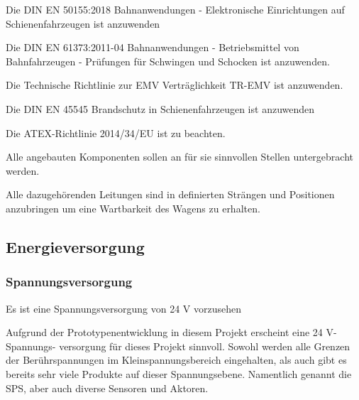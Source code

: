 \begin{feat}
Die \acrshort{DIN} \acrshort{EN} 50155:2018 Bahnanwendungen - Elektronische Einrichtungen auf Schienenfahrzeugen ist anzuwenden
\end{feat}
\begin{feat}
Die \acrshort{DIN} \acrshort{EN} 61373:2011-04 Bahnanwendungen - Betriebsmittel von Bahnfahrzeugen - Prüfungen für Schwingen und Schocken ist anzuwenden.
\end{feat}
\begin{feat}
Die Technische Richtlinie zur EMV Verträglichkeit TR-EMV ist anzuwenden.
\end{feat}
\begin{feat}
Die \acrshort{DIN} \acrshort{EN} 45545 Brandschutz in Schienenfahrzeugen ist anzuwenden
\end{feat}
\begin{feat}
Die ATEX-Richtlinie 2014/34/EU ist zu beachten.
\end{feat}
\begin{feat}
Alle angebauten Komponenten sollen an für sie sinnvollen Stellen untergebracht werden.
\end{feat}
\begin{rem}[zu Anf. 09]
Alle dazugehörenden Leitungen sind in definierten Strängen und Positionen anzubringen um eine Wartbarkeit des Wagens zu erhalten.
\end{rem}

\subsection{Energieversorgung}\label{sec:EV}
\subsubsection{Spannungsversorgung}
\begin{feat}
Es ist eine Spannungsversorgung von 24 V vorzusehen
\end{feat}
\begin{rem}[zu Anf. 10]
Aufgrund der Prototypenentwicklung in diesem Projekt erscheint eine 24 V-Spannungs- versorgung für dieses Projekt sinnvoll. Sowohl werden alle Grenzen der Berührspannungen im Kleinspannungsbereich eingehalten, als auch gibt es bereits sehr viele Produkte auf dieser Spannungsebene. Namentlich genannt die SPS, aber auch diverse Sensoren und Aktoren.
\end{rem}

